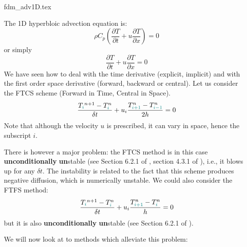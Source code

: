 \begin{flushright} {\tiny {\color{gray} fdm\_adv1D.tex}} \end{flushright}

%


The 1D hyperbloic advection equation is:
\begin{equation}
\rho C_p \left( \frac{\partial T}{\partial t}  
+ u \frac{\partial T}{\partial x} \right)=0 
\end{equation}
or simply
\begin{equation}
\frac{\partial T}{\partial t} + u \frac{\partial T}{\partial x}=0 
\end{equation}
We have seen how to deal with the time derivative (explicit, implicit) 
and with the first order space derivative (forward, backward or central).
Let us consider the FTCS scheme (Forward in Time, Central in Space).
\[
\frac{T_{\color{teal}i}^{n+1}-T^n_{\color{teal}i}}{\delta t} 
+ u_i \frac{T^n_{\color{teal}i+1} - T^n_{{\color{teal}i-1}}}{2h} =0 
\]
Note that although the velocity $u$ is prescribed, it can vary in space, hence
the subscript $i$. 

There is however a major problem: 
the FTCS method is in this case {\bf unconditionally} {\bf un}stable (see Section 6.2.1 
of \cite{hoch}, section 4.3.1 of \cite{pell08}), i.e., it blows up for any $\delta t$.
The instability is related to the fact that this scheme produces negative diffusion, 
which is numerically unstable.
We could also consider the FTFS method:
\[
\frac{T_{\color{teal}i}^{n+1}-T^n_{\color{teal}i}}{\delta t} 
+ u_i \frac{T^n_{\color{teal}i+1} - T^n_{{\color{teal}i}}}{h} =0 
\]
but it is also {\bf unconditionally} {\bf un}stable (see Section 6.2.1 of \cite{hoch}).

We will now look at to methods which alleviate this problem:

